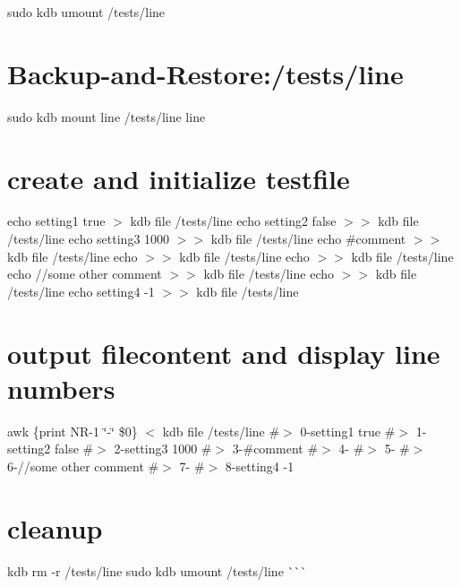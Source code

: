 sudo kdb umount /tests/line 
\begin{DoxyCode}{0}
\end{DoxyCode}
 \hypertarget{autotoc_md372_autotoc_md378}{}\section{Backup-\/and-\/\+Restore\+:/tests/line}\label{autotoc_md372_autotoc_md378}
sudo kdb mount line /tests/line line\hypertarget{autotoc_md372_autotoc_md379}{}\section{create and initialize testfile}\label{autotoc_md372_autotoc_md379}
echo \textquotesingle{}setting1 true\textquotesingle{} $>$ {\ttfamily kdb file /tests/line} echo \textquotesingle{}setting2 false\textquotesingle{} $>$$>$ {\ttfamily kdb file /tests/line} echo \textquotesingle{}setting3 1000\textquotesingle{} $>$$>$ {\ttfamily kdb file /tests/line} echo \textquotesingle{}\#comment\textquotesingle{} $>$$>$ {\ttfamily kdb file /tests/line} echo $>$$>$ {\ttfamily kdb file /tests/line} echo $>$$>$ {\ttfamily kdb file /tests/line} echo \textquotesingle{}//some other comment\textquotesingle{} $>$$>$ {\ttfamily kdb file /tests/line} echo $>$$>$ {\ttfamily kdb file /tests/line} echo \textquotesingle{}setting4 -\/1\textquotesingle{} $>$$>$ {\ttfamily kdb file /tests/line}\hypertarget{autotoc_md372_autotoc_md380}{}\section{output filecontent and display line numbers}\label{autotoc_md372_autotoc_md380}
awk \textquotesingle{}\{print N\+R-\/1 \char`\"{}-\/\char`\"{} \$0\}\textquotesingle{} $<$ {\ttfamily kdb file /tests/line} \#$>$ 0-\/setting1 true \#$>$ 1-\/setting2 false \#$>$ 2-\/setting3 1000 \#$>$ 3-\/\#comment \#$>$ 4-\/ \#$>$ 5-\/ \#$>$ 6-\///some other comment \#$>$ 7-\/ \#$>$ 8-\/setting4 -\/1\hypertarget{autotoc_md372_autotoc_md381}{}\section{cleanup}\label{autotoc_md372_autotoc_md381}
kdb rm -\/r /tests/line sudo kdb umount /tests/line \`{}\`{}\`{} 